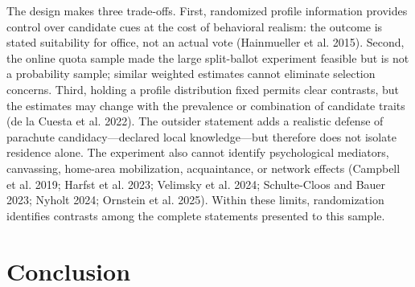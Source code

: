 \documentclass[
  letterpaper,
  DIV=11,
  numbers=noendperiod]{scrartcl}
\newcommand{\criticmarkupadd}[1]{#1}
\newcommand{\criticmarkuprm}[1]{}
\begin{document}
\criticmarkuprm{Three limits qualify these findings. }The
\criticmarkuprm{conjoint measures}\criticmarkupadd{design makes three
trade-offs. First, randomized profile information provides control over
candidate cues at the cost of behavioral realism: the outcome is} stated
\criticmarkuprm{profile evaluations,}\criticmarkupadd{suitability for
office,} not \criticmarkuprm{electoral behavior; prior behavioral
validation of paired conjoint effects (Hainmueller et al. 2015) does not
establish equivalence in Polish elections. The}\criticmarkupadd{an
actual vote (Hainmueller et al. 2015). Second, the} online quota sample
\criticmarkupadd{made the large split-ballot experiment feasible but }is
not a probability \criticmarkuprm{sample, and}\criticmarkupadd{sample;}
similar weighted estimates cannot eliminate selection concerns.
\criticmarkuprm{Finally,}\criticmarkupadd{Third, holding a profile
distribution fixed permits clear contrasts, but} the estimates
\criticmarkuprm{average over this experiment's profile distribution and
}may change with the prevalence or combination of candidate traits ({de
la Cuesta et al.} 2022). The
\criticmarkuprm{design}\criticmarkupadd{outsider statement adds a
realistic defense of parachute candidacy---declared local
knowledge---but therefore does not isolate residence alone. The
experiment} also cannot identify psychological mediators, canvassing,
home-area mobilization, acquaintance, or network
\criticmarkuprm{effects. Experimental and observational studies
distinguish local service, community embeddedness, ballot information,
and place identity}\criticmarkupadd{effects} (Campbell et al. 2019;
Harfst et al. 2023; Velimsky et al. 2024; Schulte-Cloos and Bauer 2023;
Nyholt 2024; Ornstein et al. 2025)\criticmarkuprm{, but the present
complete-statement contrasts do not separate those
explanations.}\criticmarkupadd{. Within these limits, randomization
identifies contrasts among the complete statements presented to this
sample.}

\section{Conclusion}\label{conclusion}
\end{document}
